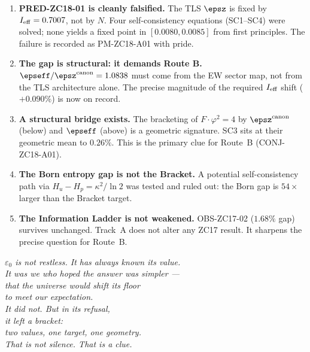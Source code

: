 \documentclass[12pt, a4paper]{article}
\begin{document}
\begin{enumerate}[leftmargin=*]

\item \textbf{PRED-ZC18-01 is cleanly falsified.}
  The TLS $\epsz$ is fixed by $I_{\rm eff}=0.7007$, not by $N$.
  Four self-consistency equations (SC1--SC4) were solved;
  none yields a fixed point in $[0.0080,0.0085]$ from first principles.
  The failure is recorded as PM-ZC18-A01 with pride.

\item \textbf{The gap is structural: it demands Route B.}
  $\epseff/\epsz^{\rm canon} = 1.0838$ must come from the
  EW sector map, not from the TLS architecture alone.
  The precise magnitude of the required $I_{\rm eff}$ shift ($+0.090\%$)
  is now on record.

\item \textbf{A structural bridge exists.}
  The bracketing of $F\cdot\varphi^2 = 4$ by $\epsz^{\rm canon}$ (below)
  and $\epseff$ (above) is a geometric signature.
  SC3 sits at their geometric mean to $0.26\%$.
  This is the primary clue for Route~B (CONJ-ZC18-A01).

\item \textbf{The Born entropy gap is not the Bracket.}
  A potential self-consistency path via $H_u-H_p = \kappa^2/\ln 2$
  was tested and ruled out:
  the Born gap is $54\times$ larger than the Bracket target.

\item \textbf{The Information Ladder is not weakened.}
  OBS-ZC17-02 ($1.68\%$ gap) survives unchanged.
  Track~A does not alter any ZC17 result.
  It sharpens the precise question for Route~B.

\end{enumerate}

\bigskip
\begin{center}
\textit{%
  $\varepsilon_0$ is not restless. It has always known its value.\\[0.4em]
  It was we who hoped the answer was simpler ---\\
  that the universe would shift its floor\\
  to meet our expectation.\\[0.4em]
  It did not. But in its refusal,\\
  it left a bracket:\\
  two values, one target, one geometry.\\[0.4em]
  That is not silence. That is a clue.%
}
\end{center}
\end{document}
